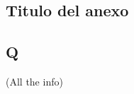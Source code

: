 \documentclass[a4paper,12pt]{article}
\begin{document}
\medskip



\begin{appendices}
\makeatletter
{}

\chapter{Titulo del anexo}
\section{Q}

(All the info)

\end{appendices}
\end{document}
